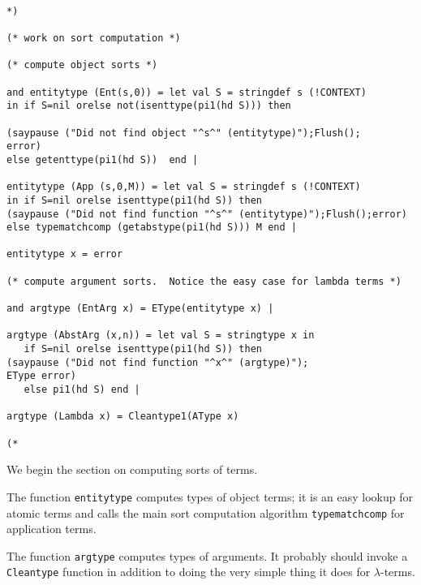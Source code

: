 \documentclass{article}
\begin{document}
\begin{verbatim}

*)

(* work on sort computation *)

(* compute object sorts *)

and entitytype (Ent(s,0)) = let val S = stringdef s (!CONTEXT)
in if S=nil orelse not(isenttype(pi1(hd S))) then 

(saypause ("Did not find object "^s^" (entitytype)");Flush();
error)
else getenttype(pi1(hd S))  end |

entitytype (App (s,0,M)) = let val S = stringdef s (!CONTEXT)
in if S=nil orelse isenttype(pi1(hd S)) then 
(saypause ("Did not find function "^s^" (entitytype)");Flush();error)
else typematchcomp (getabstype(pi1(hd S))) M end |

entitytype x = error

(* compute argument sorts.  Notice the easy case for lambda terms *)

and argtype (EntArg x) = EType(entitytype x) |

argtype (AbstArg (x,n)) = let val S = stringtype x in
   if S=nil orelse isenttype(pi1(hd S)) then 
(saypause ("Did not find function "^x^" (argtype)");
EType error)
   else pi1(hd S) end |

argtype (Lambda x) = Cleantype1(AType x)

(*

\end{verbatim}

We begin the section on computing sorts of terms. 

 The function {\tt entitytype} computes types of
object terms;  it is an easy lookup for atomic terms and calls the main sort computation algorithm {\tt typematchcomp}
for application terms.

The function {\tt argtype} computes types of arguments.  It probably should invoke a {\tt Cleantype} function in addition to doing
the very simple thing it does for $\lambda$-terms.
\end{document}

